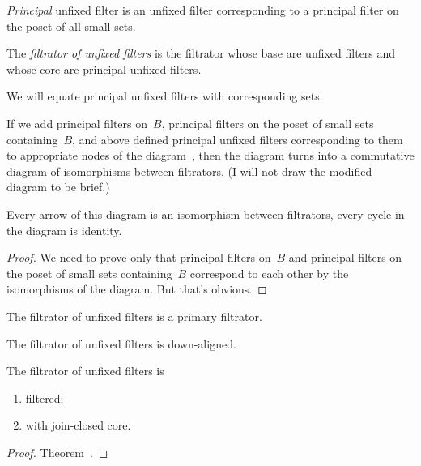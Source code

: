 \begin{defn}
\emph{Principal} unfixed filter is an unfixed filter
corresponding to a principal filter on the poset of all small
sets.
\end{defn}

\begin{defn}
The \emph{filtrator of unfixed filters} is the filtrator
whose base are unfixed filters and whose core are principal
unfixed filters.
\end{defn}

We will equate principal unfixed filters with corresponding
sets.

\begin{thm}
If we add principal filters on~$B$, principal filters on
the poset of small sets containing~$B$, and above defined
principal unfixed filters corresponding to them to
appropriate nodes of the diagram~, then
the diagram turns into a commutative diagram of isomorphisms
between filtrators. (I will not draw the modified diagram to
be brief.)

Every arrow of this diagram is an isomorphism between
filtrators, every cycle in the diagram is identity.
\end{thm}

\begin{proof}
We need to prove only that principal filters on~$B$ and
principal filters on the poset of small sets containing~$B$
correspond to each other by the isomorphisms of the diagram.
But that's obvious.
\end{proof}

\begin{obvious}
The filtrator of unfixed filters is a primary filtrator.
\end{obvious}

\begin{obvious}
The filtrator of unfixed filters is down-aligned.
\end{obvious}

\begin{prop}
The filtrator of unfixed filters is
\begin{enumerate}
\item filtered;
\item with join-closed core.
\end{enumerate}
\end{prop}

\begin{proof}
Theorem~.
\end{proof}


